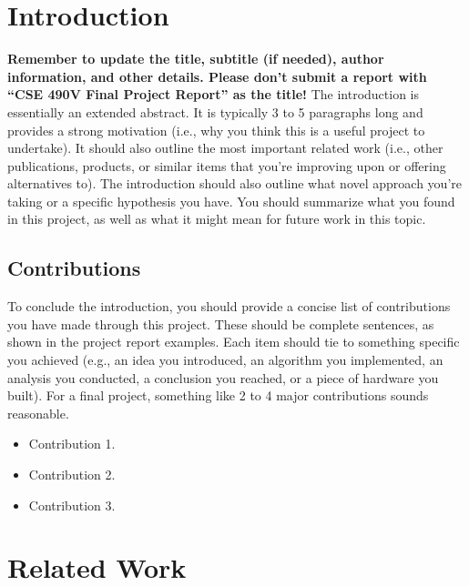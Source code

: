 \documentclass[acmtog,nonacm]{acmart}
\begin{document}
\maketitle

\section{Introduction}

\textbf{Remember to update the title, subtitle (if needed), author information, and other details. Please don't submit a report with ``CSE 490V Final Project Report'' as the title!} The introduction is essentially an extended abstract. It is typically 3 to 5 paragraphs long and provides a strong motivation (i.e., why you think this is a useful project to undertake). It should also outline the most important related work (i.e., other publications, products, or similar items that you're improving upon or offering alternatives to). The introduction should also outline what novel approach you're taking or a specific hypothesis you have. You should summarize what you found in this project, as well as what it might mean for future work in this topic.

\subsection{Contributions}

To conclude the introduction, you should provide a concise list of contributions you have made through this project. These should be complete sentences, as shown in the project report examples. Each item should tie to something specific you achieved (e.g., an  idea you introduced, an algorithm you implemented, an analysis you conducted, a conclusion you reached, or a piece of hardware you built). For a final project, something like 2 to 4 major contributions sounds reasonable.

\begin{itemize}
	\item Contribution 1.
	\item Contribution 2.
	\item Contribution 3.
\end{itemize}

\section{Related Work}
\end{document}
